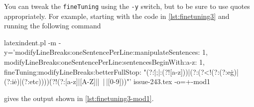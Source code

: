 \documentclass[10pt]{article}
\begin{document}
 \begin{example}
 You can tweak the \texttt{fineTuning} using the \texttt{-y} switch, but to be sure to
 use quotes appropriately. For example, starting with the code in \cref{lst:finetuning3}
 and running the following command

 \begin{commandshell}
latexindent.pl -m -y='modifyLineBreaks:oneSentencePerLine:manipulateSentences: 1, modifyLineBreaks:oneSentencePerLine:sentencesBeginWith:a-z: 1, fineTuning:modifyLineBreaks:betterFullStop: "(?:\.|;|:(?![a-z]))|(?:(?<!(?:(?:e\.g)|(?:i\.e)|(?:etc))))\.(?!(?:[a-z]|[A-Z]|\-|~|\,|[0-9]))"' issue-243.tex -o=+-mod1
\end{commandshell}

 gives the output shown in \cref{lst:finetuning3-mod1}.

 \end{example}
\end{document}

